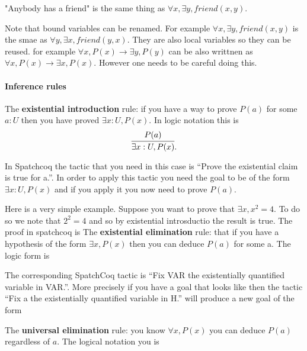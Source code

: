 "Anybody has a friend" is the same thing as $\forall x, \exists y, friend (x,y)$.

Note that bound variables can be renamed. For example $\forall x, \exists y, friend (x,y)$ is the smae as
$\forall y, \exists x, friend (y,x)$. They are also local variables so they can be reused. for example 
$\forall x, P(x)\rightarrow \exists y, P(y)$ can be also writtnen as $\forall x, P(x)\rightarrow \exists x, P(x)$. However one needs to be careful doing this.

\paragraph{\bf Inference rules}

The {\bf existential introduction} rule: if you have a way to prove $P(a)$ for some $a:U$ then you have proved $\exists x:U, P(x)$. In logic notation this is
$$\infer{\exists x:U, P(x)}{P(a)}.$$

In Spatchcoq the tactic that you need in this case is ``Prove the existential claim is true for a.''. In order to apply this tactic you need the goal to be of the form $\exists x:U, P(x)$ and if you apply it you now need to prove $P(a)$.

Here is a very simple example. Suppose you want to prove that $\exists x, x^2=4$. To do so we note that $2^2=4$ and so by existential introsductio the result is true. The proof in spatchcoq is
The  {\bf existential elimination} rule: that if you have a hypothesis of the form $\exists x, P(x)$ then you can deduce $P(a)$ for some a. The logic form is


The corresponding SpatchCoq tactic is ``Fix VAR the existentially quantified variable in VAR.''. More precisely if you have a goal that looks like
 then the tactic ``Fix a the existentially quantified variable in H.'' will produce a new goal of the form



The {\bf universal elimination} rule: you know $\forall x, P(x)$ you can deduce $P(a)$ regardless of $a$. The logical notation you is


